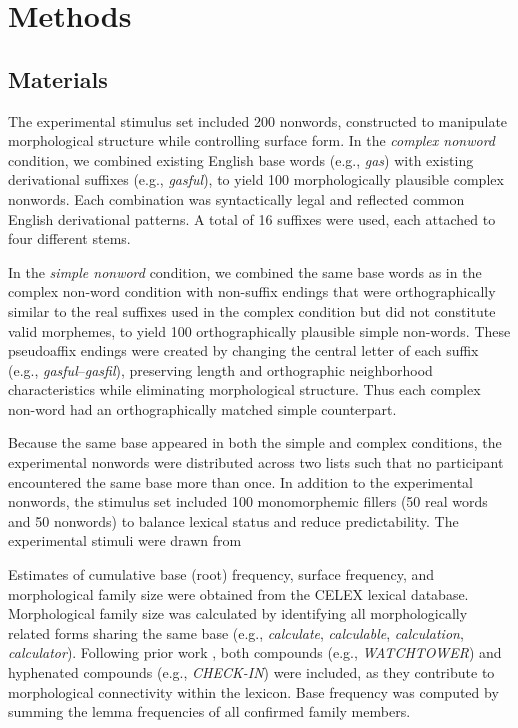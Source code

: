 \documentclass[utf8]{FrontiersinHarvard} %
\begin{document}
	\section{Methods}
	
	\subsection{Materials}
	
	The experimental stimulus set included 200 nonwords, constructed to manipulate morphological structure while controlling surface form. In the \textit{complex nonword} condition, we combined existing English base words (e.g., \textit{gas}) with existing derivational suffixes (e.g., \textit{gasful}), to yield 100 morphologically plausible complex nonwords. Each combination was syntactically legal and reflected common English derivational patterns. A total of 16 suffixes were used, each attached to four different stems.
	
	In the \textit{simple nonword} condition, we combined the same base words as in the complex non-word condition with non-suffix endings that were orthographically similar to the real suffixes used in the complex condition but did not constitute valid morphemes, to yield 100 orthographically plausible simple non-words. These pseudoaffix endings were created by changing the central letter of each suffix (e.g., \textit{gasful}–\textit{gasfil}), preserving length and orthographic neighborhood characteristics while eliminating morphological structure. Thus each complex non-word had an orthographically matched simple counterpart.
	
	Because the same base appeared in both the simple and complex conditions, the experimental nonwords were distributed across two lists such that no participant encountered the same base more than once. In addition to the experimental nonwords, the stimulus set included 100 monomorphemic fillers (50 real words and 50 nonwords) to balance lexical status and reduce predictability. The experimental stimuli were drawn from \citet{sawiIndividualDifferencesSensitivity2016}
	
	Estimates of cumulative base (root) frequency, surface frequency, and morphological family size were obtained from the CELEX lexical database. Morphological family size was calculated by identifying all morphologically related forms sharing the same base (e.g., \textit{calculate}, \textit{calculable}, \textit{calculation}, \textit{calculator}). Following prior work \citep[e.g.,][]{dejongMorphologicalFamilySize2000, dejongProcessingRepresentationDutch2002}, both compounds (e.g., \textit{WATCHTOWER}) and hyphenated compounds (e.g., \textit{CHECK-IN}) were included, as they contribute to morphological connectivity within the lexicon. Base frequency was computed by summing the lemma frequencies of all confirmed family members.
	
\end{document}
